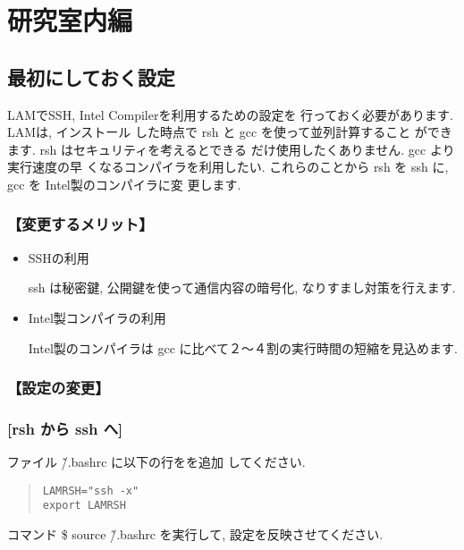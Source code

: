 \documentclass[a4paper,titlepage]{jreport}
\begin{document}
\section{研究室内編}

\subsection{最初にしておく設定}
LAMでSSH, Intel Compilerを利用するための設定を
行っておく必要があります. LAMは, インストール
した時点で rsh と gcc を使って並列計算すること
ができます. rsh はセキュリティを考えるとできる
だけ使用したくありません. gcc より実行速度の早
くなるコンパイラを利用したい. これらのことから
 rsh を ssh に, gcc を Intel製のコンパイラに変
更します.

\subsubsection{【変更するメリット】}

\begin{itemize}
\item SSHの利用

      ssh は秘密鍵, 公開鍵を使って通信内容の暗号化,
      なりすまし対策を行えます.

\item Intel製コンパイラの利用

      Intel製のコンパイラは gcc に比べて２〜４割の実行時間の短縮を見込めます. 

\end{itemize}

\subsubsection{【設定の変更】}

\subsubsection{[rsh から ssh へ]}
          ファイル \~/.bashrc に以下の行をを追加
          してください.  

\begin{quote}
\begin{screen}
\begin{verbatim}
LAMRSH="ssh -x"
export LAMRSH
\end{verbatim}
\end{screen}
\end{quote}
コマンド \$ source \~/.bashrc を実行して, 設定を反映させてください.
\end{document}
